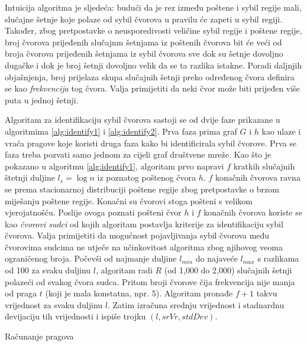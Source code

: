 \documentclass[times, utf8, seminar, numeric]{fer}
\begin{document}
Intuicija algoritma je sljedeća: budući da je rez između poštene i sybil regije mali, slučajne šetnje koje polaze od sybil čvorova u pravilu će zapeti u sybil regiji. Također, zbog pretpostavke o neusporedivosti veličine sybil regije i poštene regije, broj čvorova prijeđenih slučajnm šetnjama iz poštenih čvorova bit će veći od broja čvorova prijeđenih šetnjama iz sybil čvorova sve dok su šetnje dovoljno dugačke i dok je broj šetnji dovoljno velik da se ta razlika istakne. Poradi daljnjih objašnjenja, broj prijelaza skupa slučajnih šetnji preko određenog čvora definira se kao \textit{frekvencija} tog čvora. Valja primijetiti da neki čvor može biti prijeđen više puta u jednoj šetnji.

Algoritam za identifikaciju sybil čvorova sastoji se od dvije faze prikazane u algoritmima \ref{alg:identify1} i \ref{alg:identify2}. Prva faza prima graf $G$ i $h$ kao ulaze i vraća pragove koje koristi druga faza kako bi identificirala sybil čvorove. Prva se faza treba pozvati samo jednom za cijeli graf društvene mreže. Kao što je pokazano u algoritmu \ref{alg:identify1}, algoritam prvo napravi $f$ kratkih slučajnih štetnji duljine $l_s = \log n$ iz poznatog poštenog čvora $h$. $f$ konačnih čvorova ravna se prema stacionarnoj distribuciji poštene regije zbog pretpostavke o brzom miješanju poštene regije. Konačni su čvorovi stoga pošteni s velikom vjerojatnošću. \cite{sybil-guard} Poslije ovoga poznati pošteni čvor $h$ i $f$ konačnih čvorova koriste se kao \textit{čvorovi sudci} od kojih algoritam postavlja kriterije za identifikaciju sybil čvorova. Valja primijetiti da mogućnost pojavljivanja sybil čvorova među čvorovima sudcima ne utječe na učinkovitost algoritma zbog njihovog veoma ograničenog broja. Počevši od najmanje duljine $l_{min}$ do najaveće $l_{max}$ s razlikama od 100 za svaku duljinu $l$, algoritam radi $R$ (od 1,000 do 2,000) slučajnih šetnji polazeći od svakog čvora sudca. Pritom broji čvorove čija frekvencija nije manja od praga $t$ (koji je mala konstatna, npr. 5). Algoritam pronađe $f + 1$ takvu vrijednost za svaku duljinu $l$. Zatim izračuna srednju vrijednost i stadnardnu devijaciju tih vrijednosti i ispiše trojku $(l, srVr, stdDev)$.

\begin{algorithm}[h]
	\caption{Računanje pragova}
	\label{alg:identify1}


\end{algorithm}
\end{document}
